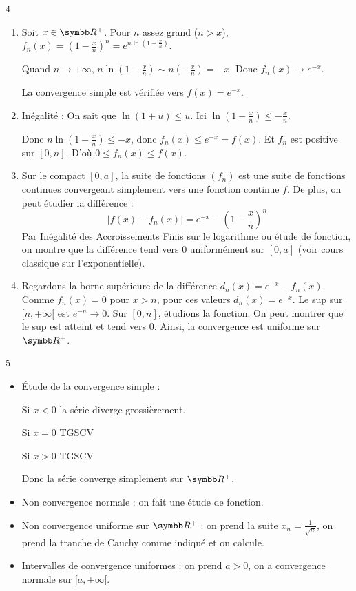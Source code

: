 \begin{correction}{4}
\begin{enumerate}
    \item Soit $x \in \R^+$. Pour $n$ assez grand ($n>x$), $f_n(x) = \left(1-\frac x n\right)^n = e^{n \ln(1-\frac x n)}$.

    Quand $n \to +\infty$, $n \ln\left(1-\frac{x}{n}\right) \sim n\left(-\frac x n\right) = -x$.
    Donc $f_n(x) \to e^{-x}$.

    La convergence simple est vérifiée vers $f(x) = e^{-x}$.

    \item Inégalité : On sait que $\ln(1+u) \leqslant u$. Ici $\ln(1-\frac{x}{n}) \leqslant -\frac{x}{n}$.

    Donc $n \ln(1-\frac{x}{n}) \leqslant -x$, donc $f_n(x) \leqslant e^{-x} = f(x)$.
    Et $f_n$ est positive sur $[0, n]$. D'où $0 \leqslant f_n(x) \leqslant f(x)$.

    \item Sur le compact $[0, a]$, la suite de fonctions $(f_n)$ est une suite de fonctions continues convergeant simplement vers une fonction continue $f$.
    De plus, on peut étudier la différence :
    \[|f(x) - f_n(x)| = e^{-x} - \left(1-\frac{x}{n}\right)^n\]
    Par Inégalité des Accroissements Finis sur le logarithme ou étude de fonction, on montre que la différence tend vers 0 uniformément sur $[0, a]$ (voir cours classique sur l'exponentielle).

    \item Regardons la borne supérieure de la différence $d_n(x) = e^{-x} - f_n(x)$.
    Comme $f_n(x) = 0$ pour $x > n$, pour ces valeurs $d_n(x) = e^{-x}$.
    Le sup sur $[n, +\infty[$ est $e^{-n} \to 0$.
    Sur $[0, n]$, étudions la fonction. On peut montrer que le sup est atteint et tend vers 0.
    Ainsi, la convergence est uniforme sur $\R^+$.
\end{enumerate}
\end{correction}

\begin{correction}{5}
\begin{itemize}
    \item 
    Étude de la convergence simple :

    Si $x < 0$ la série diverge grossièrement.

    Si $x = 0$ TGSCV

    Si $x > 0$ TGSCV

    Donc la série converge simplement sur $\R^+$.

    \item Non convergence normale : on fait une étude de fonction.

    \item Non convergence uniforme sur $\R^+$ : on prend la suite $x_n = \frac 1 {\sqrt{n}}$, on prend la tranche de Cauchy comme indiqué et on calcule.

    \item Intervalles de convergence uniformes : on prend $a > 0$, on a convergence normale sur $[a,+\infty[$.
\end{itemize}
\end{correction}

